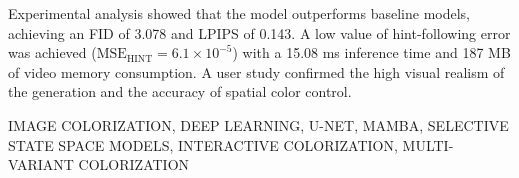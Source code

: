    Experimental analysis showed that the model outperforms baseline models, achieving an FID of 3.078 and LPIPS of 0.143.
    A low value of hint-following error was achieved ($\mathrm{MSE}_{\mathrm{HINT}} = 6.1 \times 10^{-5}$) with a 15.08 ms inference time and 187 MB of video memory consumption.
    A user study confirmed the high visual realism of the generation and the accuracy of spatial color control.

    \MakeUppercase{IMAGE COLORIZATION, DEEP LEARNING, U-NET, MAMBA, SELECTIVE STATE SPACE MODELS, INTERACTIVE COLORIZATION, MULTI-VARIANT COLORIZATION}

\clearpage









